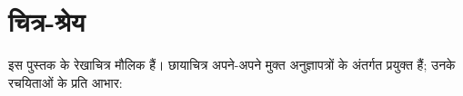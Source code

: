\chapter*{चित्र-श्रेय}

\begingroup\sloppy

इस पुस्तक के रेखाचित्र मौलिक हैं। छायाचित्र अपने-अपने मुक्त अनुज्ञापत्रों के
अंतर्गत प्रयुक्त हैं; उनके रचयिताओं के प्रति आभार:

